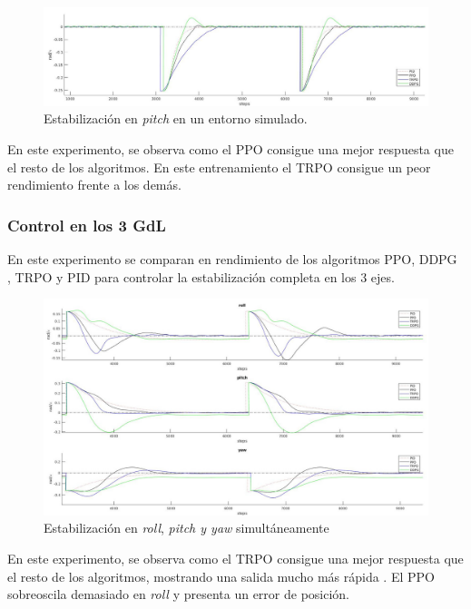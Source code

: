 \begin{figure}[htb!]
	\centering
	\includegraphics[width=\textwidth]{experimentos/sim_onlypitch}
	\caption{Estabilización en \textit{pitch} en un entorno simulado.}
	\label{mat_lab_graph}	
\end{figure}

En este experimento, se observa como el PPO consigue una mejor respuesta que el resto de los algoritmos. En este entrenamiento el TRPO consigue un peor rendimiento frente a los demás.


\subsubsection{Control en los 3 GdL}

En este experimento se comparan en rendimiento de los algoritmos PPO, DDPG , TRPO y PID para controlar la estabilización completa en los 3 ejes. 

\begin{figure}[htb!]
	\centering
	\includegraphics[width=0.9\textheight,angle=90]{experimentos/3_angles_real}
	\vspace{0.5cm}
	\caption{Estabilización en \textit{roll}, \textit{pitch y \textit{yaw}} simultáneamente}
	\label{tl_pr}	
\end{figure}

En este experimento, se observa como el TRPO consigue una mejor respuesta que el resto de los algoritmos, mostrando una salida mucho más rápida . El PPO sobreoscila demasiado en \textit{roll} y presenta un error de posición. 

